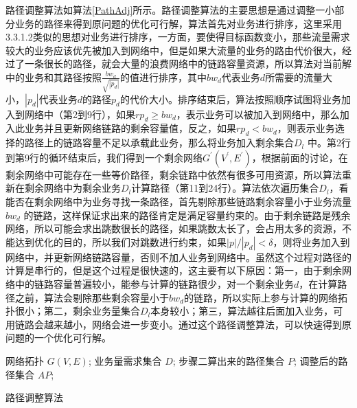 路径调整算法如算法\ref{PathAdj}所示。路径调整算法的主要思想是通过调整一小部分业务的路径来得到原问题的优化可行解，算法首先对业务进行排序，这里采用3.3.1.2类似的思想对业务进行排序，一方面，要使得目标函数变小，那些流量需求较大的业务应该优先被加入到网络中，但是如果大流量的业务的路由代价很大，经过了一条很长的路径，就会大量的浪费网络中的链路容量资源，所以算法对当前解中的业务和其路径按照$\frac{bw_d}{\sqrt{|p_d|}}$的值进行排序，其中${bw_d}$代表业务$d$所需要的流量大小，$|p_d|$代表业务$d$的路径$p_d$的代价大小。排序结束后，算法按照顺序试图将业务加入到网络中（第2到9行），如果$rp_d \ge bw_d$，表示业务可以被加入到网络中，那么加入此业务并且更新网络链路的剩余容量值，反之，如果$rp_d<bw_d$，则表示业务选择的路径上的链路容量不足以承载此业务，那么将业务加入剩余集合$D_l$ 中。第2行到第9行的循环结束后，我们得到一个剩余网络$G^{'}(V^{'},E^{'})$，根据前面的讨论，在剩余网络中可能存在一些等价路径，剩余链路中依然有很多可用资源，所以算法重新在剩余网络中为剩余业务$D_l$计算路径（第11到24行）。算法依次遍历集合$D_l$，看能否在剩余网络中为业务寻找一条路径，首先剔除那些链路剩余容量小于业务流量$bw_d$ 的链路，这样保证求出来的路径肯定是满足容量约束的。由于剩余链路是残余网络，所以可能会求出跳数很长的路径，如果跳数太长了，会占用太多的资源，不能达到优化的目的，所以我们对跳数进行约束，如果$|p|/|p_d|<\delta$，则将业务加入到网络中，并更新网络链路容量，否则不加人业务到网络中。虽然这个过程对路径的计算是串行的，但是这个过程是很快速的，这主要有以下原因：第一，由于剩余网络中的链路容量普遍较小，能参与计算的链路很少，对一个剩余业务$d$，在计算路径之前，算法会剔除那些剩余容量小于$bw_d$的链路，所以实际上参与计算的网络拓扑很小；第二，剩余业务量集合$D_l$本身较小；第三，算法越往后面加入业务，可用链路会越来越小，网络会进一步变小。通过这个路径调整算法，可以快速得到原问题的一个优化可行解。
\begin{algorithm}[t]
\begin{algorithmic}[1]
\Require
网络拓扑 $G(V, E)$;
业务量需求集合 $D$;
步骤二算出来的路径集合 $P$;
\Ensure
调整后的路径集合 $AP$;
\Else
{}
\EndIf
\EndFor
{}
\EndIf
\EndFor
{}
\EndIf
\EndFor
\end{algorithmic}
\caption{路径调整算法}
\label{PathAdj}
\end{algorithm}

